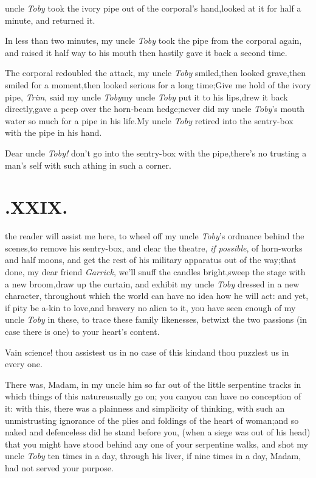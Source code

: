 \documentclass{article}
\begin{document}
 uncle \textit{Toby} took the ivory
pipe out of the corporal’s hand,\tsk looked at it for half
a minute, and returned it.

In less than two minutes, my uncle \textit{Toby} took the pipe
from the corporal again, and raised it half way to his
mouth\break
\tsh then hastily gave it back a second time.

The corporal redoubled the attack,\break
\tsh my uncle \textit{Toby} smiled,\tsh then looked
grave,\tsh then smiled for a moment,\tsh then
looked serious for a long time;\tsh Give me hold of the
ivory pipe, \textit{Trim}, said my uncle \textit{Toby}\tsh my
uncle \textit{Toby} put it to his lips,\tsh drew it back
directly,\tsh gave a peep over the horn-beam
hedge;\tsh never did my uncle \textit{Toby}’s mouth
water so much for a pipe in his life.\tsh My uncle
\textit{Toby} retired into the sentry-box with the pipe\break
in his hand.\tsh

\tsh Dear uncle \textit{Toby!} don’t go into the
sentry-box with the pipe,\tsk there’s no trusting a
man’s self with such a\break thing in such a corner.

\enlargethispage{2\baselineskip}
\section{.\enspace XXIX.}

 the reader will assist me here, to\break
wheel off my uncle \textit{Toby}’s ordnance behind the
scenes,\tsh to remove his sentry-box, and clear the
theatre, \textit{if possible}, of horn-works and half moons, and get the
rest of his military appa\-ratus out of the way;\tsh that
done, my dear friend \textit{Garrick}, we’ll snuff the candles
bright,\tsk sweep the stage with a new broom,\tsk draw up the
curtain, and exhibit my uncle \textit{Toby} dressed in a new
character, throughout which the world can have no idea how he will
act: and yet, if pity be a-kin to love,\tsk and bravery no alien
to it, you have seen enough of my uncle \textit{Toby} in these, to
trace these family likenesses, betwixt the two passions (in case
there is one) to your heart’s content.

Vain science! thou assistest us in no case of this
kind\tsk and thou puzzlest us in every one.

There was, Madam, in my uncle\break 
{}
him so far out of the little serpentine tracks in
which things of this nature\break usually go on; you can\tsk you can
have no conception of it: with this, there was a plainness and
simplicity of thinking, with such an unmistrusting ignorance of the
plies and foldings of the heart of woman;\tsh and so naked
and defenceless did he stand before you, (when a siege was out of
his head) that you might have stood behind any one of your
serpentine walks, and shot my uncle \textit{Toby} ten times in a day,
through his liver, if nine times in a day, Madam, had not served
your purpose.
\end{document}
